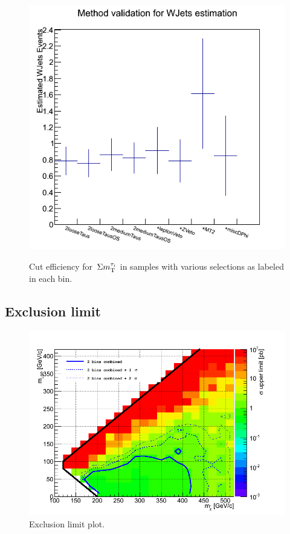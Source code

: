 \begin{figure}[htbp]
\includegraphics[angle=0,scale=0.35]{TauTauFigs/WJetsEst_bin2_BJetVetoApplied.png} \\
\caption{Cut efficiency for %
$\,\Sigma m_{\rm T}^{\tau_i}$ %
in samples with various selections as labeled in each bin.}
\label{fig:justification_bin2}
\end{figure}
\subsection{Exclusion limit}
\begin{figure}[htbp]
\centering
\includegraphics[angle=0,scale=0.35]{TauTauFigs/diTau_exclusion.png}
\caption{Exclusion limit plot.}
\label{fig:exclusion}
\end{figure}
